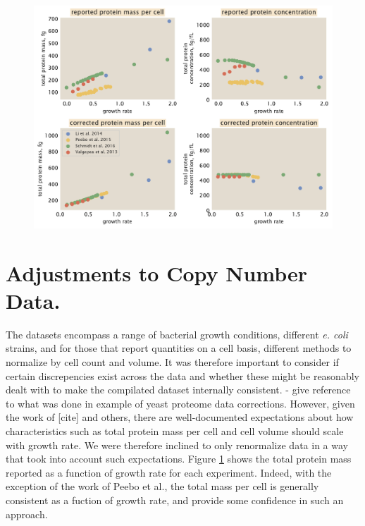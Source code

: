 \documentclass[11pt, letterpaper]{article}
\begin{document}
\begin{figure}[H]
		\centering
    \includegraphics[width=1\textwidth]{../../figures/dataset_corrections.pdf}
  \caption{}
  \label{fig:dataset_correlations}
\end{figure}


\section{Adjustments to Copy Number Data.}



The datasets encompass a range of bacterial growth conditions,  different {\it
e. coli} strains, and for those that report quantities on a cell basis,
different methods to normalize  by  cell count and volume. It was therefore
important to consider if certain discrepencies exist across the data and whether
these might be reasonably dealt with to make the compilated dataset internally
consistent. - give reference to what was done in example of yeast proteome data
corrections. However, given the work of [cite] and others, there are
well-documented expectations about how characteristics such as total protein
mass per cell and cell volume  should scale with growth rate. We were therefore
inclined to only renormalize data in a  way  that took into account such
expectations. Figure \ref{} shows the total protein  mass reported as a function
of growth rate for each experiment. Indeed, with the exception of the work of
Peebo et al., the total mass per cell is generally consistent as a fuction of
growth rate, and provide some confidence in such an approach.
\end{document}
